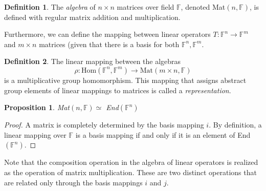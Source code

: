 \documentclass{article}
\newtheorem{proposition}[theorem]{Proposition}
\theoremstyle{remark}
\theoremstyle{definition}
\newtheorem{definition}{Definition}[section]
\begin{document}
    \begin{definition}
    The \textit{algebra} of $n \times n$ matrices over field $\mathbb{F}$, denoted Mat$(n, \mathbb{F})$, is defined with regular matrix addition and multiplication. 
    \end{definition}

    Furthermore, we can define the mapping between linear operators $T: \mathbb{F}^n \longrightarrow \mathbb{F}^m$ and $m \times n$ matrices (given that there is a basis for both $\mathbb{F}^n, \mathbb{F}^m$. 

    \begin{definition}
    The linear mapping between the algebras 
    \[\rho: \text{Hom}(\mathbb{F}^n, \mathbb{F}^m) \longrightarrow \text{Mat}(m \times n, \mathbb{F})\]
    is a multiplicative group homomorphism. This mapping that assigns abstract group elements of linear mappings to matrices is called a \textit{representation}. 
    \end{definition}

    \begin{proposition}
    Mat$(n, \mathbb{F}) \simeq $ End$(\mathbb{F}^n)$ 
    \end{proposition}
    \begin{proof}
    A matrix is completely determined by the basis mapping $i$. By definition, a linear mapping over $\mathbb{F}$ is a basis mapping if and only if it is an element of End$(\mathbb{F}^n)$. 
    \end{proof}

    Note that the composition operation in the algebra of linear operators is realized as the operation of matrix multiplication. These are two distinct operations that are related only through the basis mappings $i$ and $j$. 
\end{document}

